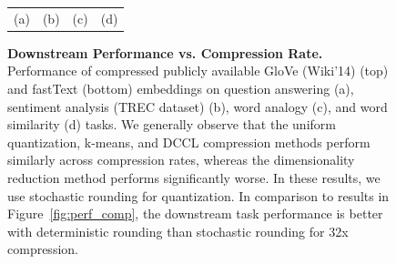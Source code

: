 \begin{figure}
\begin{tabular}{@{\hskip -0.0in}c@{\hskip -0.0in}c@{\hskip -0.0in}c@{\hskip -0.0in}c@{\hskip -0.0in}}
		\;\;\;\;\;(a) & \;\;\;\;\;\;(b) & \;\;\;\;\;\;(c) & \;\;\;\;\;\;(d)
	\end{tabular}
	\caption{
		\textbf{Downstream Performance vs. Compression Rate.}
		Performance of compressed publicly available GloVe (Wiki'14) (top) and fastText (bottom) embeddings on question answering (a), sentiment analysis (TREC dataset) (b), word analogy (c), and word similarity (d) tasks.
		We generally observe that the uniform quantization, k-means, and DCCL compression methods perform similarly across compression rates, whereas the dimensionality reduction method performs significantly worse. In these results, we use stochastic rounding for quantization. In comparison to results in Figure~\ref{fig:perf_comp}, the downstream task performance is better with deterministic rounding than stochastic rounding for 32x compression. 
	}
	\label{fig:perf_comp_stoc}
\end{figure}


